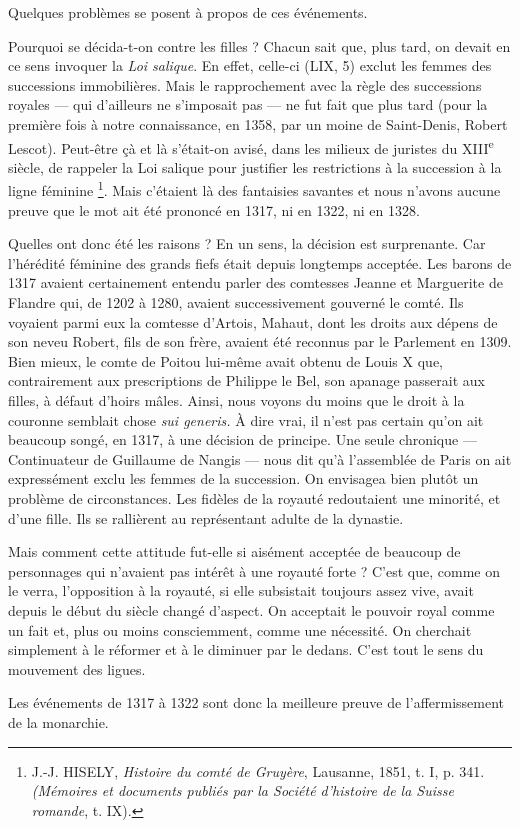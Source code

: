 \documentclass[french,twoside]{book} %
\newcommand{\labelchar}[1]{{\color{rubric}\bf #1}}
\begin{document}
Quelques problèmes se posent à propos de ces événements.\par
\bigbreak
\noindent \labelchar{1)} Pourquoi se décida-t-on contre les filles ? Chacun sait que, plus tard, on devait en ce sens invoquer la \emph{Loi salique}. En effet, celle-ci (LIX, 5) exclut les femmes des successions immobilières. Mais le rapprochement avec la règle des successions royales — qui d’ailleurs ne s’imposait pas — ne fut fait que plus tard (pour la première fois à notre connaissance, en 1358, par un moine de Saint-Denis, Robert Lescot). Peut-être çà et là s’était-on avisé, dans les milieux de juristes du XIII\textsuperscript{e} siècle, de rappeler la Loi salique pour justifier les restrictions à la succession à la ligne féminine \footnote{ J.-J. HISELY, {\itshape Histoire du comté de Gruyère}, Lausanne, 1851, t. I, p. 341. {\itshape (Mémoires et documents publiés par la Société d’histoire de la Suisse romande}, t. IX).}. Mais c’étaient là des fantaisies savantes et nous n’avons aucune preuve que le mot ait été prononcé en 1317, ni en 1322, ni en 1328.\par
\label{p14} Quelles ont donc été les raisons ? En un sens, la décision est surprenante. Car l’hérédité féminine des grands fiefs était depuis longtemps acceptée. Les barons de 1317 avaient certainement entendu parler des comtesses Jeanne et Marguerite de Flandre qui, de 1202 à 1280, avaient successivement gouverné le comté. Ils voyaient parmi eux la comtesse d’Artois, Mahaut, dont les droits aux dépens de son neveu Robert, fils de son frère, avaient été reconnus par le Parlement en 1309. Bien mieux, le comte de Poitou lui-même avait obtenu de Louis X que, contrairement aux prescriptions de Philippe le Bel, son apanage passerait aux filles, à défaut d’hoirs mâles. Ainsi, nous voyons du moins que le droit à la couronne semblait chose {\itshape sui generis.} À dire vrai, il n’est pas certain qu’on ait beaucoup songé, en 1317, à une décision de principe. Une seule chronique — Continuateur de Guillaume de Nangis — nous dit qu’à l’assemblée de Paris on ait expressément exclu les femmes de la succession. On envisagea bien plutôt un problème de circonstances. Les fidèles de la royauté redoutaient une minorité, et d’une fille. Ils se rallièrent au représentant adulte de la dynastie.\par
\bigbreak
\noindent \labelchar{2)} Mais comment cette attitude fut-elle si aisément acceptée de beaucoup de personnages qui n’avaient pas intérêt à une royauté forte ? C’est que, comme on le verra, l’opposition à la royauté, si elle subsistait toujours assez vive, avait depuis le début du siècle changé d’aspect. On acceptait le pouvoir royal comme un fait et, plus ou moins consciemment, comme une nécessité. On cherchait simplement à le réformer et à le diminuer par le dedans. C’est tout le sens du mouvement des ligues.\par
Les événements de 1317 à 1322 sont donc la meilleure preuve de l’affermissement de la monarchie.
\end{document}
